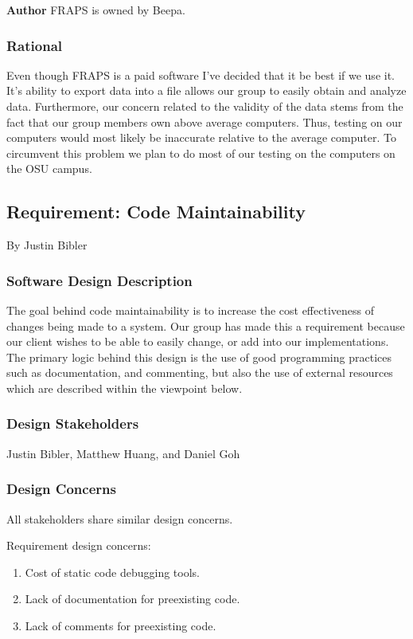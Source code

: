 \begin{flushleft}
\textbf{Author}
FRAPS is owned by Beepa.\cite{fraps}

\subsubsection{Rational}
Even though FRAPS is a paid software I've decided that it be best if we use it.
It's ability to export data into a file allows our group to easily obtain and analyze data.
Furthermore, our concern related to the validity of the data stems from the fact that our group members own above average computers.
Thus, testing on our computers would most likely be inaccurate relative to the average computer.
To circumvent this problem we plan to do most of our testing on the computers on the OSU campus.

\newpage

\subsection{Requirement: Code Maintainability}
\large{By Justin Bibler}

\normalsize
\subsubsection{Software Design Description}
The goal behind code maintainability is to increase the cost effectiveness of changes being made to a system. \cite{maintain}
Our group has made this a requirement because our client wishes to be able to easily change, or add into our implementations.
The primary logic behind this design is the use of good programming practices such as documentation, and commenting, but also the use of external resources which are described within the viewpoint below.

\subsubsection{Design Stakeholders}
Justin Bibler, Matthew Huang, and Daniel Goh

\subsubsection{Design Concerns}
All stakeholders share similar design concerns.

Requirement design concerns:
\begin{enumerate}
\item Cost of static code debugging tools.
\item Lack of documentation for preexisting code.
\item Lack of comments for preexisting code.
\end{enumerate}


\end{flushleft}

